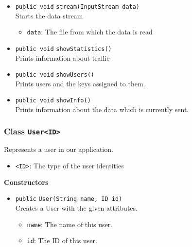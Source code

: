 \begin{itemize}
\item \lstinline|public void| \lstinline|stream|\lstinline|(InputStream data)|\\
Starts the data stream
\begin{itemize}
\item \lstinline|data|: The file from which the data is read
\end{itemize}



\item \lstinline|public void| \lstinline|showStatistics|\lstinline|()|\\
Prints information about traffic



\item \lstinline|public void| \lstinline|showUsers|\lstinline|()|\\
Prints users and the keys assigned to them.



\item \lstinline|public void| \lstinline|showInfo|\lstinline|()|\\
Prints information about the data which is currently sent.



\end{itemize}

\subsubsection{Class \lstinline|User<ID>|}
Represents a user in our application. \\



\begin{itemize}
\item \lstinline|<ID>|: The type of the user identities
\end{itemize}


\textbf{Constructors}
\begin{itemize}
\item \lstinline|public| \lstinline|User|\lstinline|(String name, ID id)|\\
Creates a User with the given attributes.
\begin{itemize}
\item \lstinline|name|: The name of this user.
\item \lstinline|id|: The ID of this user.
\end{itemize}



\end{itemize}


